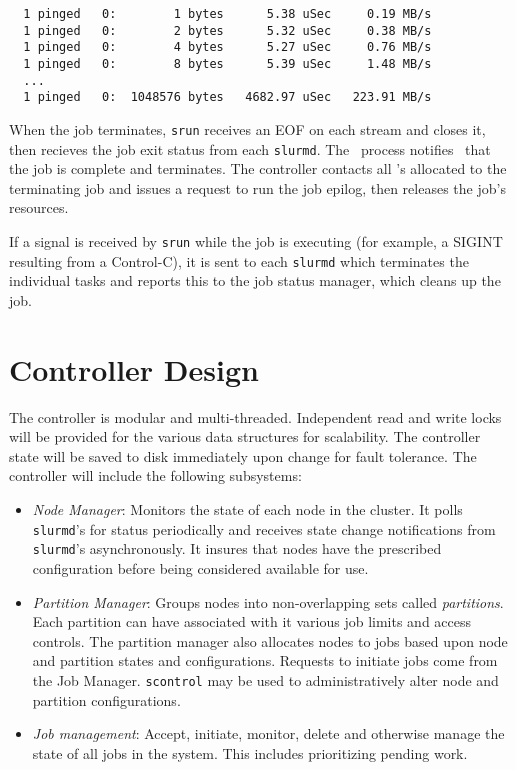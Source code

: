 \begin{verbatim}
  1 pinged   0:        1 bytes      5.38 uSec     0.19 MB/s                     
  1 pinged   0:        2 bytes      5.32 uSec     0.38 MB/s                     
  1 pinged   0:        4 bytes      5.27 uSec     0.76 MB/s                     
  1 pinged   0:        8 bytes      5.39 uSec     1.48 MB/s                     
  ...
  1 pinged   0:  1048576 bytes   4682.97 uSec   223.91 MB/s              
\end{verbatim}

When the job terminates, {\tt srun} receives an EOF on each stream and
closes it, then recieves the job exit status from each {\tt slurmd}.
The \srun\ process notifies \slurmctld\ that the job is complete 
and terminates. The controller contacts all \slurmd 's allocated to the
terminating job and issues a request to run the job epilog, then releases
the job's resources.

If a signal is received by {\tt srun} while the job is executing (for example,
a SIGINT resulting from a Control-C), it is sent to each {\tt slurmd} which 
terminates the individual tasks and reports this to the job status manager,
which cleans up the job.

\section{Controller Design}

The controller is modular and multi-threaded.  Independent read
and write locks will be provided for the various data structures for
scalability.  The controller state will be saved to disk immediately
upon change for fault tolerance.  The controller  will include the
following subsystems:

\begin{itemize}
\item {\em Node Manager}: Monitors the state of each node in
the cluster.  It polls {\tt slurmd}'s for status periodically and
receives state change notifications from {\tt slurmd}'s asynchronously.
It insures that nodes have the prescribed configuration before being 
considered available for use.

\item {\em Partition Manager}: Groups nodes into non-overlapping sets called
{\em partitions}. Each partition can have associated with it various job
limits and access controls.  The partition manager also allocates nodes
to jobs based upon node and partition states and configurations. Requests
to initiate jobs come from the Job Manager.  {\tt scontrol} may be used
to administratively alter node and partition configurations.

\item {\em Job management}: Accept, initiate, monitor, delete and
otherwise manage the state of all jobs in the system. This includes
prioritizing pending work.


\end{itemize}

